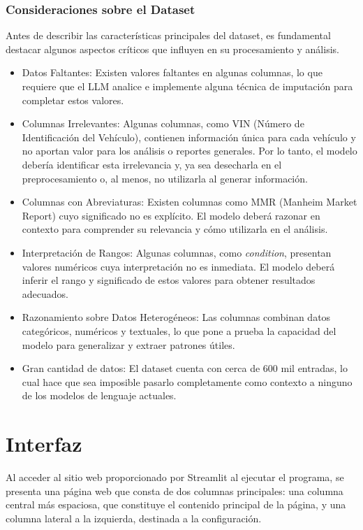\subsubsection{Consideraciones sobre el Dataset}
Antes de describir las características principales del dataset, es fundamental destacar algunos aspectos críticos que influyen en su procesamiento y análisis.
\begin{itemize}
	\item{Datos Faltantes:}
	Existen valores faltantes en algunas columnas, lo que requiere que el LLM analice e implemente alguna técnica de imputación para completar estos valores.
	
	\item{Columnas Irrelevantes:}
	Algunas columnas, como VIN (Número de Identificación del Vehículo), contienen información única para cada vehículo y no aportan valor para los análisis o reportes generales. Por lo tanto, el modelo debería identificar esta irrelevancia y, ya sea desecharla en el preprocesamiento o, al menos, no utilizarla al generar información.
	
	\item{Columnas con Abreviaturas:}
	Existen columnas como MMR (Manheim Market Report) cuyo significado no es explícito. El modelo deberá razonar en contexto para comprender su relevancia y cómo utilizarla en el análisis.
	
	\item{Interpretación de Rangos:}
	Algunas columnas, como \textit{condition}, presentan valores numéricos cuya interpretación no es inmediata. El modelo deberá inferir el rango y significado de estos valores para obtener resultados adecuados.
	
	\item{Razonamiento sobre Datos Heterogéneos:}
	Las columnas combinan datos categóricos, numéricos y textuales, lo que pone a prueba la capacidad del modelo para generalizar y extraer patrones útiles.
	
	\item{Gran cantidad de datos:}
	El dataset cuenta con cerca de 600 mil entradas, lo cual hace que sea imposible pasarlo completamente como contexto a ninguno de los modelos de lenguaje actuales.
\end{itemize}

\section{Interfaz}
Al acceder al sitio web proporcionado por Streamlit al ejecutar el programa, se presenta una página web que consta de dos columnas principales: una columna central más espaciosa, que constituye el contenido principal de la página, y una columna lateral a la izquierda, destinada a la configuración.

